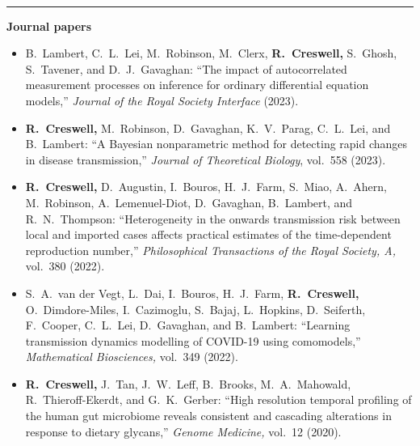 \documentclass[11pt]{article}
\begin{document}
\vspace{-2.75mm} \\
\rule{\textwidth}{0.4pt}
\vspace*{.5cm}
\noindent\textbf{Journal papers}
\begin{itemize}[leftmargin=*]
\setlength{\itemsep}{4pt}
\setlength{\parskip}{0pt}
\setlength{\parsep}{0pt}
\vspace*{-.5cm}


\item {\color{gray}B.\ Lambert, C.\ L.\ Lei, M.\ Robinson, M.\ Clerx,} \textbf{R.\ Creswell,} {\color{gray} S.\ Ghosh, S.\ Tavener, and D.\ J.\ Gavaghan:} ``The impact of autocorrelated measurement processes on inference for ordinary differential equation models,'' \emph{Journal of the Royal Society Interface} (2023).


\item \textbf{R.\ Creswell,} {\color{gray} M.\ Robinson, D.\ Gavaghan, K.\ V.\ Parag, C.\ L.\ Lei, and B.\ Lambert:} ``A Bayesian nonparametric method for detecting rapid changes in disease transmission,'' \emph{Journal of Theoretical Biology}, vol.\ 558 (2023).

\item \textbf{R.\ Creswell,\textsuperscript{\dag}} {\color{gray}D.\ Augustin,\textsuperscript{\dag} I.\ Bouros,\textsuperscript{\dag} H.\ J.\ Farm,\textsuperscript{\dag} S.\ Miao,\textsuperscript{\dag} A.\ Ahern,\textsuperscript{\dag} M.\ Robinson, A.\ Lemenuel-Diot, D.\ Gavaghan, B.\ Lambert, and R.\ N.\ Thompson:} ``Heterogeneity in the onwards transmission risk between local and imported cases affects practical estimates of the time-dependent reproduction number,'' \emph{Philosophical Transactions of the Royal Society, A,} vol.\ 380 (2022).

\item {\color{gray} S.\ A.\ van der Vegt,\textsuperscript{\dag} L.\ Dai,\textsuperscript{\dag} I.\ Bouros,\textsuperscript{\dag} H.\ J.\ Farm,\textsuperscript{\dag} \textbf{\color{black}R.\ Creswell,\textsuperscript{\dag}} O.\ Dimdore-Miles,\textsuperscript{\dag} I.\ Cazimoglu, S.\ Bajaj, L.\ Hopkins, D.\ Seiferth, F.\ Cooper, C.\ L.\ Lei, D.\ Gavaghan, and B.\ Lambert:} ``Learning transmission dynamics modelling of COVID-19 using comomodels,'' \emph{Mathematical Biosciences,} vol.\ 349 (2022).

\item \textbf{R.\ Creswell,\textsuperscript{\dag}} {\color{gray}J.\ Tan,\textsuperscript{\dag} J.\ W.\ Leff, B.\ Brooks, M.\ A.\ Mahowald, R.\ Thieroff-Ekerdt, and G.\ K.\ Gerber:} ``High resolution temporal profiling of the human gut microbiome reveals consistent and cascading alterations in response to dietary glycans,'' \emph{Genome Medicine,} vol.\ 12 (2020).


\end{itemize}
\end{document}
